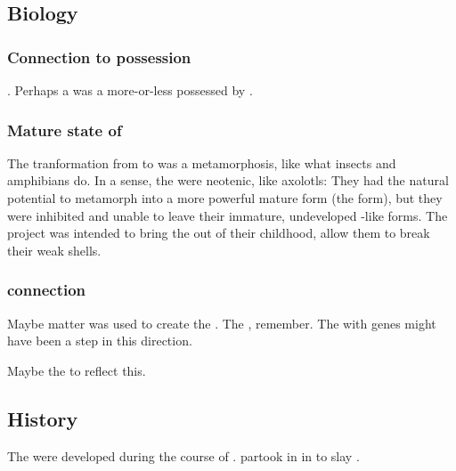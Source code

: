 \subsection{Biology}





\subsubsection{Connection to \bane possession}
\Banes {}. 
Perhaps a \neoresphan was a \resphan more-or-less possessed by \banes.






\subsubsection{Mature state of \resphain}
The tranformation from \resphan to \neoresphan was a metamorphosis, like what insects and amphibians do. 
In a sense, the \resphain were neotenic, like axolotls: 
They had the natural potential to metamorph into a more powerful mature form (the \neoresphan form), but they were inhibited and unable to leave their immature, undeveloped \human-like forms. 
The \neoresphan project was intended to bring the \resphain out of their childhood, allow them to break their weak shells.





\subsubsection{\Noggyal connection}
Maybe \noggyal matter was used to create the \neoresphain. 
The \banes {}, remember.
The \neoresphain with \noggyal genes might have been a step in this direction. 

Maybe the \neoresphain {} to reflect this. 









\subsection{History}
The \neoresphain{} were developed during the course of {\SentinelsofMithEmph}. 
 partook in  in  to slay \QuessanthIshnaruchaefir. 

